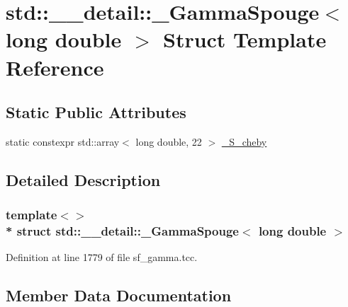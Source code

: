 \hypertarget{structstd_1_1____detail_1_1__GammaSpouge_3_01long_01double_01_4}{}\section{std\+:\+:\+\_\+\+\_\+detail\+:\+:\+\_\+\+Gamma\+Spouge$<$ long double $>$ Struct Template Reference}
\label{structstd_1_1____detail_1_1__GammaSpouge_3_01long_01double_01_4}
\subsection*{Static Public Attributes}
\begin{DoxyCompactItemize}
\item 
static constexpr std\+::array$<$ long double, 22 $>$ \hyperlink{structstd_1_1____detail_1_1__GammaSpouge_3_01long_01double_01_4_a9a0ccac34908981667d678ef8ef1fcbc}{\+\_\+\+S\+\_\+cheby}
\end{DoxyCompactItemize}


\subsection{Detailed Description}
\subsubsection*{template$<$$>$\\*
struct std\+::\+\_\+\+\_\+detail\+::\+\_\+\+Gamma\+Spouge$<$ long double $>$}



Definition at line 1779 of file sf\+\_\+gamma.\+tcc.



\subsection{Member Data Documentation}
